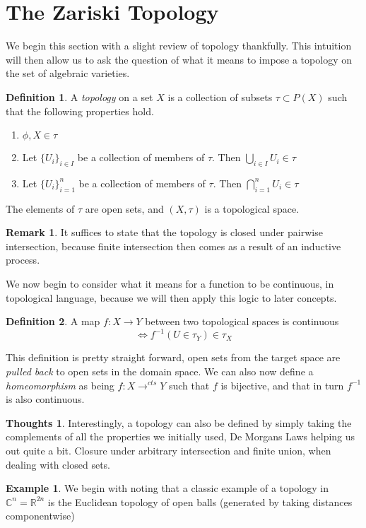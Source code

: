 \documentclass[12pt]{book}
\theoremstyle{definition}
\newtheorem*{defn}{Definition}
\newtheorem{eg}{Example}[chapter]
\newtheorem*{huh}{Thoughts}
\newtheorem*{rem}{Remark}
\begin{document}
\section{The Zariski Topology}
We begin this section with a slight review of topology thankfully. This intuition will then allow us to ask the question of what it means to impose a topology on the set of algebraic varieties. 
\begin{defn}
    A \textit{topology} on a set $X$ is a collection of subsets $\tau \subset P(X)$ such that the following properties hold. \begin{enumerate}
        \item $\phi, X \in \tau$
        \item Let $\{U_i\}_{i \in I}$ be a collection of members of $\tau$. Then $\bigcup_{i \in I} U_i \in \tau$
        \item Let $\{U_i\}_{i = 1}^n$ be a collection of members of $\tau$. Then $\bigcap_{i = 1}^n U_i \in \tau$
    \end{enumerate}
    The elements of $\tau$ are open sets, and $(X, \tau)$ is a topological space.
\end{defn}
\begin{rem}
    It suffices to state that the topology is closed under pairwise intersection, because finite intersection then comes as a result of an inductive process.
\end{rem}
We now begin to consider what it means for a function to be continuous, in topological language, because we will then apply this logic to later concepts.
\begin{defn}
    A map $f: X \to Y$ between two topological spaces is continuous $$\iff f^{-1}(U \in \tau_Y) \in \tau_X$$
\end{defn}
This definition is pretty straight forward, open sets from the target space are \textit{pulled back} to open sets in the domain space.
We can also now define a \textit{homeomorphism} as being $f:X \to^{cts} Y$ such that $f$ is bijective, and that in turn $f^{-1}$ is also continuous.
\begin{huh}
    Interestingly, a topology can also be defined by simply taking the complements of all the properties we initially used, De Morgans Laws helping us out quite a bit. Closure under arbitrary intersection and finite union, when dealing with closed sets.
\end{huh}
\begin{eg}
    We begin with noting that a classic example of a topology in $\mathbb{C}^n = \mathbb{R}^{2n}$ is the Euclidean topology of open balls (generated by taking distances componentwise)
\end{eg}
\end{document}
